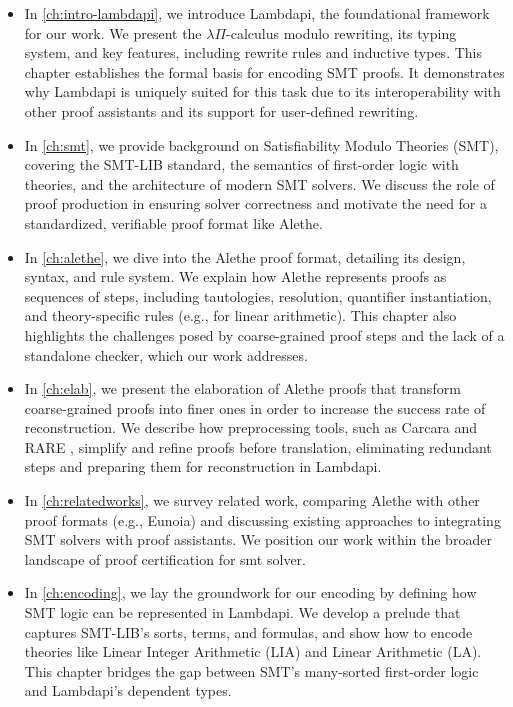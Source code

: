 \begin{itemize}
\item In \cref{ch:intro-lambdapi}, we introduce Lambdapi, the foundational framework for our work.
    We present the $\lambda\Pi$-calculus modulo rewriting, its typing system, and key features, including rewrite rules and inductive types.
    This chapter establishes the formal basis for encoding SMT proofs.
    It demonstrates why Lambdapi is uniquely suited for this task due to its interoperability with other proof assistants and its support for user-defined rewriting.

\item In \cref{ch:smt}, we provide background on Satisfiability Modulo Theories (SMT), covering the SMT-LIB standard, the semantics of first-order logic with theories, and the architecture of modern SMT solvers.
We discuss the role of proof production in ensuring solver correctness and motivate the need for a standardized, verifiable proof format like Alethe.

\item In \cref{ch:alethe}, we dive into the Alethe proof format, detailing its design, syntax, and rule system.
We explain how Alethe represents proofs as sequences of steps, including tautologies, resolution, quantifier instantiation, and theory-specific rules (e.g., for linear arithmetic).
This chapter also highlights the challenges posed by coarse-grained proof steps and the lack of a standalone checker, which our work addresses.

\item In \cref{ch:elab}, we present the elaboration of Alethe proofs that transform coarse-grained proofs into finer ones in order to increase the success rate of reconstruction.
     We describe how preprocessing tools, such as Carcara \cite{carcara} and RARE \cite{rare}, simplify and refine proofs before translation, eliminating redundant steps and preparing them for reconstruction in Lambdapi.

\item In \cref{ch:relatedworks}, we survey related work, comparing Alethe with other proof formats (e.g., Eunoia) and discussing existing approaches to integrating SMT solvers with proof assistants.
    We position our work within the broader landscape of proof certification for smt solver.

\item In \cref{ch:encoding}, we lay the groundwork for our encoding by defining how SMT logic can be represented in Lambdapi.
    We develop a prelude that captures SMT-LIB's sorts, terms, and formulas, and show how to encode theories like Linear Integer Arithmetic (LIA) and Linear Arithmetic (LA).
    This chapter bridges the gap between SMT's many-sorted first-order logic and Lambdapi's dependent types.


\end{itemize}

